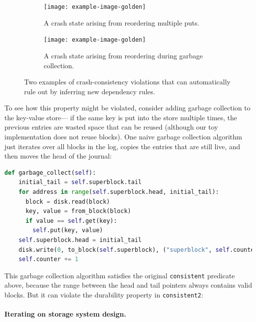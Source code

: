 \begin{figure}
  \centering
  \begin{subfigure}[t]{0.48\textwidth}
    \centering
    \texttt{[image: example-image-golden]}
    \caption{A crash state arising from reordering multiple puts.}
    \label{fig:overview2:put}
  \end{subfigure}%
  \quad%
  \begin{subfigure}[t]{0.48\textwidth}
    \centering
    \texttt{[image: example-image-golden]}
    \caption{A crash state arising from reordering during garbage collection.}
    \label{fig:overview2:gc}
  \end{subfigure}
  \caption{Two examples of crash-consistency violations that \depsynth can automatically rule out by inferring new dependency rules.}
  \label{fig:overview2}
\end{figure}

To see how this property might be violated,
consider adding garbage collection to the key-value store---%
if the same key is put into the store multiple times,
the previous entries are wasted space that can be reused
(although our toy implementation does not reuse blocks).
One naive garbage collection algorithm just iterates over all blocks in the log,
copies the entries that are still live,
and then moves the head of the journal:
%
\begin{lstlisting}[language=py]
  def garbage_collect(self):
    initial_tail = self.superblock.tail
    for address in range(self.superblock.head, initial_tail):
      block = disk.read(block)
      key, value = from_block(block)
      if value == self.get(key):
        self.put(key, value)
    self.superblock.head = initial_tail
    disk.write(0, to_block(self.superblock), ("superblock", self.counter))
    self.counter += 1
\end{lstlisting}
%
This garbage collection algorithm satisfies the original \texttt{consistent} predicate above,
because the range between the head and tail pointers always contains valid blocks.
But it can violate the durability property in \texttt{consistent2}:


\paragraph{Iterating on storage system design.}

